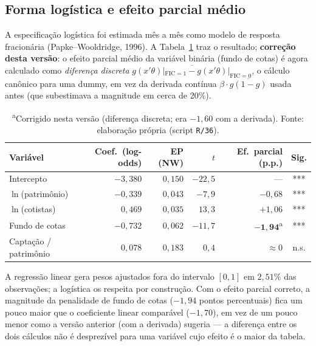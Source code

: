 \documentclass[12pt,a4paper]{article}
\begin{document}
\subsection{Forma logística e efeito parcial médio}
\label{sec:fraclogit}

A especificação logística foi estimada mês a mês como modelo de resposta fracionária
(Papke--Wooldridge, 1996). A Tabela~\ref{tab:logit} traz o resultado; \textbf{correção desta
versão}: o efeito parcial médio da variável binária (fundo de cotas) é agora calculado como
\emph{diferença discreta} $\overline{g(x'\theta)|_{\mathrm{FIC}=1}-g(x'\theta)|_{\mathrm{FIC}=0}}$,
o cálculo canônico para uma dummy, em vez da derivada contínua $\beta\cdot\overline{g(1-g)}$
usada antes (que subestimava a magnitude em cerca de 20\%).

\begin{table}[h]\centering\footnotesize
\caption{Regressão transversal logística, resumo Fama--MacBeth com Newey-West.}
\label{tab:logit}
\begin{tabular}{@{}lrrrrc@{}}
\toprule
Variável & Coef.\ (log-odds) & EP (NW) & $t$ & Ef.\ parcial (p.p.) & Sig. \\
\midrule
Intercepto              & $-3{,}380$ & $0{,}150$ & $-22{,}5$ & --- & *** \\
$\ln$(patrimônio)       & $-0{,}339$ & $0{,}043$ & $-7{,}9$  & $-0{,}68$ & *** \\
$\ln$(cotistas)         & $0{,}469$  & $0{,}035$ & $13{,}3$  & $+1{,}06$ & *** \\
Fundo de cotas           & $-0{,}732$ & $0{,}062$ & $-11{,}7$ & $\mathbf{-1{,}94}$\textsuperscript{a} & *** \\
Captação / patrimônio   & $0{,}078$  & $0{,}183$ & $0{,}4$   & $\approx 0$ & n.s. \\
\bottomrule
\end{tabular}
\caption*{\footnotesize \textsuperscript{a}Corrigido nesta versão (diferença discreta; era
$-1{,}60$ com a derivada). Fonte: elaboração própria (script \texttt{R/36}).}
\end{table}

A regressão linear gera pesos ajustados fora do intervalo $[0,1]$ em $2{,}51\%$ das observações;
a logística os respeita por construção. Com o efeito parcial correto, a magnitude da penalidade
de fundo de cotas ($-1{,}94$ pontos percentuais) fica um pouco maior que o coeficiente linear
comparável ($-1{,}70$), em vez de um pouco menor como a versão anterior (com a derivada) sugeria
--- a diferença entre os dois cálculos não é desprezível para uma variável cujo efeito é o maior
da tabela.
\end{document}
